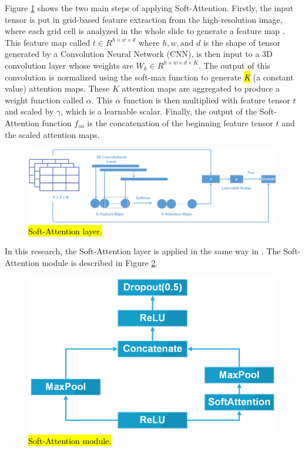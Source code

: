 \documentclass[sensors,article,accept,pdftex,moreauthors]{Definitions/mdpi}
\begin{document}
	Figure \ref{fig:soft-attention} shows the two main steps of applying Soft-Attention. Firstly, the input tensor is put in grid-based feature extraction from the high-resolution image, where each grid cell is analyzed in the whole slide to generate a feature map \cite{08513}. This feature map called $t \in R^{h \times w \times d}$ where $h, w, \text{and } d$ is the shape of tensor generated by a Convolution Neural Network (CNN), is then input to a 3D convolution layer whose weights are $W_k \in R^{h \times w \times d \times K}$. The output of this convolution is normalized using the soft-max function to generate \hl{\textit{K}} %
 (a constant value) attention maps. These $\textit{K}$ attention maps are aggregated to produce a weight function called $\alpha$. This $\alpha$ function is then multiplied with feature tensor $t$ and scaled by $\gamma$, which is a learnable scalar. Finally, the output of the Soft-Attention function $f_{sa}$ is the concatenation of the beginning feature tensor $t$ and the scaled attention maps. 
	
	\begin{figure}[H]
		\includegraphics[width=1\linewidth]{Definitions/SoftAttention}
		\caption{\hl{Soft-Attention layer.} %
}
		\label{fig:soft-attention}
	\end{figure}
	
	In this research, the Soft-Attention layer is applied in the same way in \cite{03358}. The Soft-Attention module is described in Figure \ref{fig:soft-attention-block}. 
	
	\begin{figure}[H]
		\includegraphics[width=0.5\linewidth]{Definitions/SoftAttentionBlock}
		\caption{\hl{Soft-Attention module.} %
}
		\label{fig:soft-attention-block}
	\end{figure}
	
\end{document}
